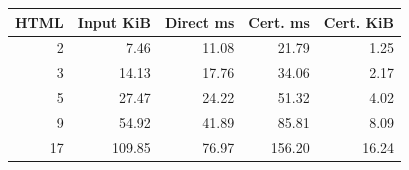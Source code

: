 \begin{tabular}{rrrrr}
\toprule
HTML & Input KiB & Direct ms & Cert. ms & Cert. KiB \\
\midrule
2 & 7.46 & 11.08 & 21.79 & 1.25 \\
3 & 14.13 & 17.76 & 34.06 & 2.17 \\
5 & 27.47 & 24.22 & 51.32 & 4.02 \\
9 & 54.92 & 41.89 & 85.81 & 8.09 \\
17 & 109.85 & 76.97 & 156.20 & 16.24 \\
\bottomrule
\end{tabular}
